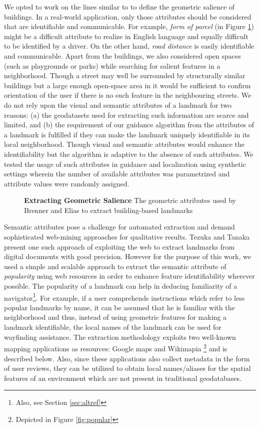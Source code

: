\documentclass{iitkthesis}
\begin{document}
We opted to work on the lines similar to \cite{brenner} to define the 
geometric salience of buildings. In a real-world application, only those 
attributes should be considered that are identifiable and communicable. 
For example, \textit{form of parcel} (in Figure \ref{fig:elias}) might be 
a difficult attribute to realize in English language and equally 
difficult to be identified by a driver. On the other hand, \textit{road 
distance} is easily identifiable and communicable. Apart from the 
buildings, we also considered open spaces (such as playgrounds or parks) 
while searching for salient features in a neighborhood. Though a street 
may well be surrounded by structurally similar buildings but a large 
enough open-space area in it would be sufficient to confirm orientation 
of the user if there is no such feature in the neighbouring streets. We 
do not rely upon the visual and semantic attributes of a landmark for two 
reasons: (a) the geodatasets used for extracting such information are 
scarce and limited, and (b) the requirement of our guidance algorithm 
from the attributes of a landmark is fulfilled if they can make the 
landmark uniquely identifiable in its local neighborhood. Though visual 
and semantic attributes would enhance the identifiability but the 
algorithm is adaptive to the absence of such attributes. We tested the 
usage of such attributes in guidance and localization using synthetic 
settings wherein the number of available attributes was parametrized and 
attribute values were randomly assigned.

\begin{figure}
\centering
{}
\caption{\textbf{Extracting Geometric Salience} The geometric attributes 
used by Brenner and Elias \cite{brenner} to extract building-based 
landmarks}
\label{fig:elias}
 \end{figure}

Semantic attributes pose a challenge for automated extraction and demand 
sophisticated web-mining approaches for qualitative results. Tezuka 
and Tanaka~\cite{tezuka} present one such approach of exploiting the
web to extract landmarks from digital documents with good precision. 
However for the purpose of this work, we used a simple and scalable 
approach to extract the semantic attribute of \textit{popularity} using web 
resources in order to enhance feature identifiability wherever possible. 
The popularity of a landmark can help in deducing familiarity of a 
navigator\footnote{Also, see Section \ref{sec:altref}}. For example, if a 
user comprehends instructions which refer to less popular landmarks by 
name, it can be assumed that he is familiar with the neighborhood 
and thus, instead of using geometric features for making a landmark 
identifiable, the local names of the landmark can be used for wayfinding 
assistance. The extraction methodology exploits two well-known mapping 
applications as resources: Google maps \cite{gmaps} and Wikimapia 
\cite{wiki}\footnote{Depicted in Figure \ref{fig:popular}} and is 
described below.  Also, since these applications also collect metadata in 
the form of user reviews, they can be utilized to obtain local names/aliases 
for the spatial features of an environment which are not present in 
traditional geodatabases.
\end{document}
